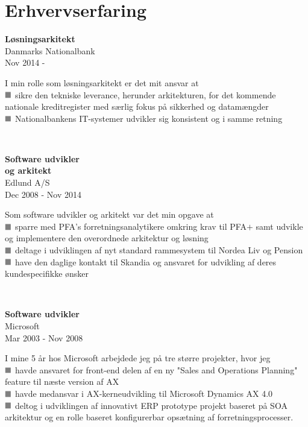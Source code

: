 \documentclass[10pt, a4paper]{article}
\newcommand*{\greysquare}{\textcolor{gray}{\blacksquare}}
\begin{document}
\section{Erhvervserfaring}
\begin{Row}%
  \begin{Cell}{1}
    \textbf{Løsningsarkitekt} \\ [1ex]
    Danmarks Nationalbank \\ 
    Nov 2014 -   
  \end{Cell}
  \begin{Cell}{3}
    I min rolle som løsningsarkitekt er det mit ansvar at \\ [1ex]
    $\greysquare$ sikre den tekniske leverance, herunder arkitekturen, for det kommende nationale kreditregister med særlig fokus på sikkerhed og datamængder \\
    $\greysquare$ Nationalbankens IT-systemer udvikler sig konsistent og i samme retning
  \end{Cell}
\end{Row}
\\[0.5cm]
\begin{Row}
  \begin{Cell}{1}
    \textbf{Software udvikler \\ 
    og arkitekt} \\ [1ex]
    Edlund A/S \\ 
    Dec 2008 - Nov 2014  
  \end{Cell}
  \begin{Cell}{3}
    Som software udvikler og arkitekt var det min opgave at \\ [1ex]
    $\greysquare$ sparre med PFA's forretningsanalytikere omkring krav til PFA$+$ samt udvikle og implementere den overordnede arkitektur og løsning \\
    $\greysquare$ deltage i udviklingen af nyt standard rammesystem til Nordea Liv og Pension \\
    $\greysquare$ have den daglige kontakt til Skandia og ansvaret for udvikling af deres kundespecifikke ønsker
  \end{Cell}
\end{Row}
\\[0.5cm]
\begin{Row}%
  \begin{Cell}{1}
    \textbf{Software udvikler} \\ [1ex]
    Microsoft \\ 
    Mar 2003 - Nov 2008  
  \end{Cell}
  \begin{Cell}{3}
    I mine 5 år hos Microsoft arbejdede jeg på tre større projekter, hvor jeg \\ [1ex]
    $\greysquare$ havde ansvaret for front-end delen af en ny "Sales and Operations Planning" feature til næste version af AX \\
    $\greysquare$ havde medansvar i AX-kerneudvikling til Microsoft Dynamics AX 4.0 \\
    $\greysquare$ deltog i udviklingen af innovativt ERP prototype projekt baseret på SOA arkitektur og en rolle baseret konfigurerbar opsætning af forretningsprocesser. 
  \end{Cell}
\end{Row}
\end{document}
